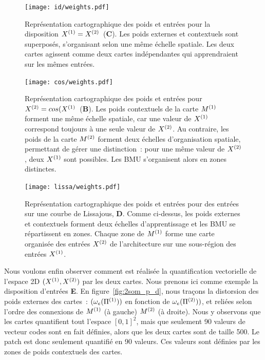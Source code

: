 \documentclass[../main]{subfiles}
\begin{document}
\begin{figure}
\begin{minipage}{\textwidth}
	\centering\texttt{[image: id/weights.pdf]}
	\vspace{-0.3cm}
	\caption{Représentation cartographique des poids et entrées pour la disposition $X^{({1})} = X^{({2})}$~(\textbf{C}). Les poids externes et contextuels sont superposés, s'organisant selon une même échelle spatiale. Les deux cartes agissent comme deux cartes indépendantes qui apprendraient sur les mêmes entrées. \label{fig:id_results}}
	\centering\texttt{[image: cos/weights.pdf]}
	\vspace{-0.3cm}
\caption{Représentation cartographique des poids et entrées pour $X^{({2})} = cos(X^{({1})}$~(\textbf{B}). Les poids contextuels de la carte $M^{({1})}$ forment une même échelle spatiale, car une valeur de $X^{({1})}$ correspond toujours à une seule valeur de $X^{({2})}$. Au contraire, les poids de la carte $M^{({2})}$ forment deux échelles d'organisation spatiale, permettant de gérer une distinction~: pour une même valeur de $X^{({2})}$, deux $X^{({1})}$ sont possibles. Les BMU s'organisent alors en zones distinctes.
\label{fig:cos_results}}
	\centering\texttt{[image: lissa/weights.pdf]}
	\vspace{-0.3cm}
	\caption{Représentation cartographique des poids et entrées pour des entrées sur une courbe de Lissajous, \textbf{D}.
	Comme ci-dessus, les poids externes et contextuels forment deux échelles d'apprentissage et les BMU se répartissent en zones.
	Chaque zone de $M^{({1})}$ forme une carte organisée des entrées $X^{({2})}$ de l'architecture sur une sous-région des entrées $X^{({1})}$. \label{fig:lissa}}
\end{minipage}
\end{figure}

Nous voulons enfin observer comment est réalisée la quantification vectorielle de l'espace 2D $(X^{({1})}, X^{({2})})$ par les deux cartes. Nous prenons ici comme exemple la disposition d'entrées \textbf{E}.
En figure~\ref{fig:2som_p_d}, nous traçons la distorsion des poids externes des cartes~: $(\omega_e(\Pi^{({1})}))$ en fonction de  $\omega_e(\Pi^{({2})}))$, et reliées selon l'ordre des connexions de $M^{({1})}$ (à gauche) $M^{({2})}$ (à droite).
Nous y observons que les cartes quantifient tout l'espace $[0,1]^2$, mais que seulement 90 valeurs de vecteur codes sont en fait définies, alors que les deux cartes sont de taille 500. Le patch est donc seulement quantifié en 90 valeurs. Ces valeurs sont définies par les zones de poids contextuels des cartes. 
\end{document}
